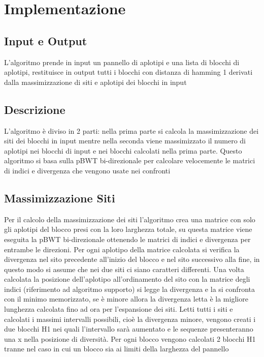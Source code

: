 \documentclass{article}
\begin{document}
\section{Implementazione}

\subsection{Input e Output}
L'algoritmo prende in input un pannello di aplotipi e una lista di blocchi di aplotipi, restituisce in output tutti i blocchi con distanza di hamming 1 derivati dalla massimizzazione di siti e aplotipi dei blocchi in input

\subsection{Descrizione}
L'algoritmo è diviso in 2 parti: nella prima parte si calcola la massimizzazione dei siti dei blocchi in input mentre nella seconda viene massimizzato il numero di aplotipi nei blocchi di input e nei blocchi calcolati nella prima parte. Questo algoritmo si basa sulla pBWT bi-direzionale per calcolare velocemente le matrici di indici e divergenza che vengono usate nei confronti

\subsection{Massimizzazione Siti}
Per il calcolo della massimizzazione dei siti l'algoritmo crea una matrice con solo gli aplotipi del blocco presi con la loro larghezza totale, su questa matrice viene eseguita la pBWT bi-direzionale ottenendo le matrici di indici e divergenza per entrambe le direzioni. Per ogni aplotipo della matrice calcolata si verifica la divergenza nel sito precedente all'inizio del blocco e nel sito successivo alla fine, in questo modo si assume che nei due siti ci siano caratteri differenti. Una volta calcolata la posizione dell'aplotipo all'ordinamento del sito con la matrice degli indici (riferimento ad algoritmo supporto) si legge la divergenza e la si confronta con il minimo memorizzato, se è  minore allora la divergenza letta è la migliore lunghezza calcolata fino ad ora per l'espansione dei siti. Letti tutti i siti e calcolati i massimi intervalli possibili, cioè la divergenza minore, vengono creati i due blocchi H1 nei quali l'intervallo sarà aumentato e le sequenze presenteranno una x nella posizione di diversità. Per ogni blocco vengono calcolati 2 blocchi H1 tranne nel caso in cui un blocco sia ai limiti della larghezza del pannello
\end{document}
